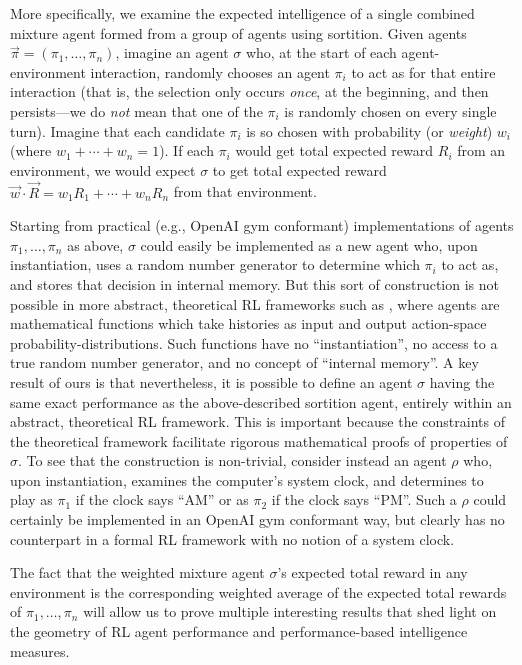 \documentclass[twoside]{article}
\begin{document}
More specifically, we examine the expected intelligence of a single combined
mixture agent formed from a group of agents using sortition.
Given agents $\vec{\pi}=(\pi_1,\ldots,\pi_n)$,
imagine an agent $\sigma$
who, at the start of each agent-environment interaction, randomly chooses
an agent $\pi_i$ to act as for that entire interaction (that is, the selection
only occurs \emph{once}, at the beginning, and then persists---we do \emph{not}
mean that one of the $\pi_i$ is randomly chosen on every single turn).
Imagine that each candidate $\pi_i$ is so chosen with probability (or \emph{weight})
$w_i$ (where $w_1+\cdots+w_n=1$). If each $\pi_i$ would get total expected
reward $R_i$ from an environment,
we would expect $\sigma$ to get total expected reward
$\vec{w}\cdot \vec{R}=w_1R_1+\cdots+w_nR_n$ from that environment.

Starting from practical (e.g., OpenAI gym conformant)
implementations of agents $\pi_1,\ldots,\pi_n$ as above, $\sigma$ could easily be
implemented as a new agent who, upon instantiation, uses a random number generator
to determine which $\pi_i$ to act as, and stores that decision in internal memory.
But this sort of construction is not possible in more abstract, theoretical
RL frameworks such as \cite{legg2007universal}, where agents are mathematical functions
which take histories as input and output action-space probability-distributions.
Such functions have no ``instantiation'', no access to a true random number
generator, and no concept of ``internal memory''. A key result of ours is that
nevertheless, it is possible to define an agent $\sigma$ having the same exact performance
as the above-described sortition agent, entirely within an abstract, theoretical
RL framework. This is important because the constraints of the theoretical framework
facilitate rigorous mathematical proofs of properties of $\sigma$. To see that the
construction
is non-trivial, consider instead an agent $\rho$ who, upon instantiation, examines the
computer's system clock, and determines to play as $\pi_1$ if the clock says ``AM'' or as
$\pi_2$ if the clock says ``PM''. Such a $\rho$ could certainly be implemented in an
OpenAI gym conformant way, but clearly has no counterpart in a formal RL framework
with no notion of a system clock.

The fact that the weighted mixture agent $\sigma$'s expected total reward in any
environment is the corresponding weighted average of the expected total rewards of
$\pi_1,\ldots,\pi_n$ will allow us to prove multiple interesting results that
shed light on the geometry of RL agent performance and performance-based intelligence
measures.
\end{document}

